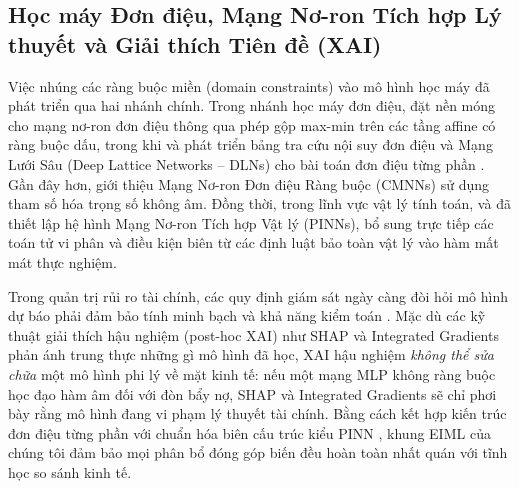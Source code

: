 \documentclass[11pt,a4paper]{article}
\begin{document}
\subsection{Học máy Đơn điệu, Mạng Nơ-ron Tích hợp Lý thuyết và Giải thích Tiên đề (XAI)}
Việc nhúng các ràng buộc miền (domain constraints) vào mô hình học máy đã phát triển qua hai nhánh chính. Trong nhánh học máy đơn điệu, \citet{sill1997monotonic} đặt nền móng cho mạng nơ-ron đơn điệu thông qua phép gộp max-min trên các tầng affine có ràng buộc dấu, trong khi \citet{gupta2016monotonic} và \citet{you2017deep} phát triển bảng tra cứu nội suy đơn điệu và Mạng Lưới Sâu (Deep Lattice Networks -- DLNs) cho bài toán đơn điệu từng phần \citep{cano2019monotonic}. Gần đây hơn, \citet{runje2023constrained} giới thiệu Mạng Nơ-ron Đơn điệu Ràng buộc (CMNNs) sử dụng tham số hóa trọng số không âm. Đồng thời, trong lĩnh vực vật lý tính toán, \citet{raissi2019physics} và \citet{karniadakis2021physics} đã thiết lập hệ hình Mạng Nơ-ron Tích hợp Vật lý (PINNs), bổ sung trực tiếp các toán tử vi phân và điều kiện biên từ các định luật bảo toàn vật lý vào hàm mất mát thực nghiệm.

Trong quản trị rủi ro tài chính, các quy định giám sát ngày càng đòi hỏi mô hình dự báo phải đảm bảo tính minh bạch và khả năng kiểm toán \citep{bussmann2021explainable,bucker2022transparency}. Mặc dù các kỹ thuật giải thích hậu nghiệm (post-hoc XAI) như SHAP \citep{lundberg2017unified} và Integrated Gradients \citep{sundararajan2017axiomatic} phản ánh trung thực những gì mô hình đã học, XAI hậu nghiệm \textit{không thể sửa chữa} một mô hình phi lý về mặt kinh tế: nếu một mạng MLP không ràng buộc học đạo hàm âm đối với đòn bẩy nợ, SHAP và Integrated Gradients sẽ chỉ phơi bày rằng mô hình đang vi phạm lý thuyết tài chính. Bằng cách kết hợp kiến trúc đơn điệu từng phần \citep{sill1997monotonic,runje2023constrained} với chuẩn hóa biên cấu trúc kiểu PINN \citep{raissi2019physics}, khung EIML của chúng tôi đảm bảo mọi phân bổ đóng góp biến đều hoàn toàn nhất quán với tĩnh học so sánh kinh tế.
\end{document}
